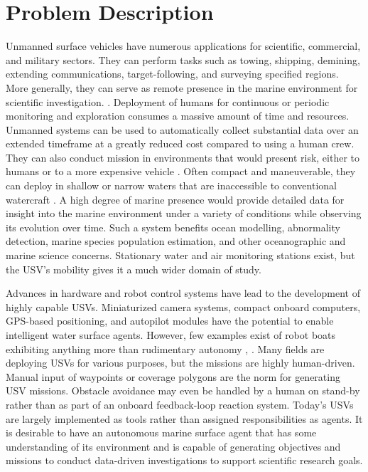 \documentclass{tamuccthesis}
\begin{document}
\section{Problem Description}

Unmanned surface vehicles have numerous applications for scientific, commercial, and military sectors. They can perform tasks such as towing, shipping, demining, extending communications, target-following, and surveying specified regions. More generally, they can serve as remote presence in the marine environment for scientific investigation. \cite{manley2008unmanned}. Deployment of humans for continuous or periodic monitoring and exploration consumes a massive amount of time and resources. Unmanned systems can be used to automatically collect substantial data over an extended timeframe at a greatly reduced cost compared to using a human crew. They can also conduct mission in environments that would present risk, either to humans or to a more expensive vehicle \cite{liu:2016}. Often compact and maneuverable, they can deploy in shallow or narrow waters that are inaccessible to conventional watercraft \cite{liu:2016}. A high degree of marine presence would provide detailed data for insight into the marine environment under a variety of conditions while observing its evolution over time. Such a system benefits ocean modelling, abnormality detection, marine species population estimation, and other oceanographic and marine science concerns. Stationary water and air monitoring stations exist, but the USV's mobility gives it a much wider domain of study. 

Advances in hardware and robot control systems have lead to the development of highly capable USVs. Miniaturized camera systems, compact onboard computers, GPS-based positioning, and autopilot modules have the potential to enable intelligent water surface agents. However, few examples exist of robot boats exhibiting anything more than rudimentary autonomy \cite{bertram2008unmanned}, \cite{liu:2016}. Many fields are deploying USVs for various purposes, but the missions are highly human-driven. Manual input of waypoints or coverage polygons are the norm for generating USV missions. Obstacle avoidance may even be handled by a human on stand-by rather than as part of an onboard feedback-loop reaction system. Today's USVs are largely implemented as tools rather than assigned responsibilities as agents. It is desirable to have an autonomous marine surface agent that has some understanding of its environment and is capable of generating objectives and missions to conduct data-driven investigations to support scientific research goals.
\end{document}
